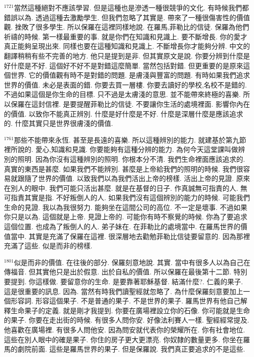 \documentclass{book}
\begin{document}
$^{1721}$當然這種絕對不應該學習.
但是這種也是滲透一種很競爭的文化.
有時候我們都錯誤以為.
透過這種去激勵學生.
但我們忽略了其實是.
帶來了一種很傷害性的價值觀.
挫敗了很多學生.
所以保羅在這裡同樣地說.
在羅馬,菲勒比的信徒.
保羅為他們祈禱的時候.
第一樣最重要的事.
就是你們在知識和見識上.
要不斷增長.
你的愛才真正能夠呈現出來.
同樣也要在這種知識和見識上.
不斷增長你才能夠分辨.
中文的翻譯稍稍有些不完善的地方.
他只是提到是非.
但其實原文是說.
你要分辨到什麼是好什麼是不好.
這個好不好不是對錯這麼簡單.
當然包括對錯.
但更重要的是原來這個世界.
它的價值觀有時不是對錯的問題.
是膚淺與豐富的問題.
有時如果我們追求世界的價值.
未必是表面的錯.
你要去買一層樓.
你要去讀好的學校,名校不是錯的.
不過如果這個是你生命的目標.
只不過是太膚淺的意思.
並不能帶來終極的喜樂.
所以保羅在這封信裡.
是要提醒菲勒比的信徒.
不要讓你生活的處境裡面.
影響你內在的價值.
以致你不能真正辨別.
什麼是好什麼是不好.
什麼是深層什麼是應該追求的.
什麼其實只是世界很膚淺的價值.

$^{1761}$那些不能帶來永恆.
甚至是長遠的喜樂.
所以這種辨別的能力.
就建基於第九節裡所說的.
愛心,知識和見識.
你要能夠有這種分辨的能力.
為何今天這堂課叫做辨別的照明.
因為你沒有這種辨別的照明.
你根本分不清.
我們生命裡面應該追求的.
真實的東西是甚麼.
如果我們不能辨別.
甚麼是上帝給我們的照明的時候.
我們很容易就跟隨了世界的價值.
以致我們以為我們活出上帝的榜樣.
活出上帝的見證.
原來在別人的眼中.
我們可能只活出甚麼.
就是在基督的日子.
作真誠無可指責的人.
無可指責其實是指.
不好叛倒人的人.
如果我們沒有這個辨別的能力的時候.
可能我們生命的見證.
我以為我很努力.
能夠坐在這間公司的高位.
不一定是壞事.
不過如果你只是以為.
這個就是上帝.
見證上帝的.
可能你有時不察覺的時候.
你為了要追求這個位置.
也成為了叛倒人的人.
弟子妹在.
在菲勒比的處境當中.
在羅馬世界的價值當中.
其實是充滿了保羅在這裡.
很深層地去勸勉菲勒比信徒要留意的.
因為那裡充滿了這些.
似是而非的榜樣.

$^{1801}$似是而非的價值.
在往後的部分.
保羅刻意地說.
其實.
當中有很多人以為自己在傳福音.
但其實他只是出於假意.
出於自私的價值.
所以保羅在最後第十二節.
特別要提到.
你這樣做.
要留意你的生命.
是要靠著耶穌基督.
結滿什麼?.
仁義的果子.
這是很重要的訊息.
因為.
當然有時我們讀聖經就忽略了.
為什麼保羅刻意要加上一個形容詞.
形容這個果子.
不是普通的果子.
不是世界的果子.
羅馬世界有他自己解釋生命果子的定義.
就是剛才我提到.
你要在廣場裡設立你的石像.
你可能就是生命的果子.
你要在走出街的時候.
有很多人問你安.
好像法利賽人一樣.
聖經經常提及.
他喜歡在廣場裡.
有很多人問他安.
因為問安就代表你的榮耀所在.
你有社會地位.
這些在別人眼中的確是果子.
你住的房子更大更漂亮.
你奴隸的數量更多.
你坐在羅馬的劇院前面.
這些是羅馬世界的果子.
但是保羅說.
我們真正要追求的不是這些.
\end{document}

